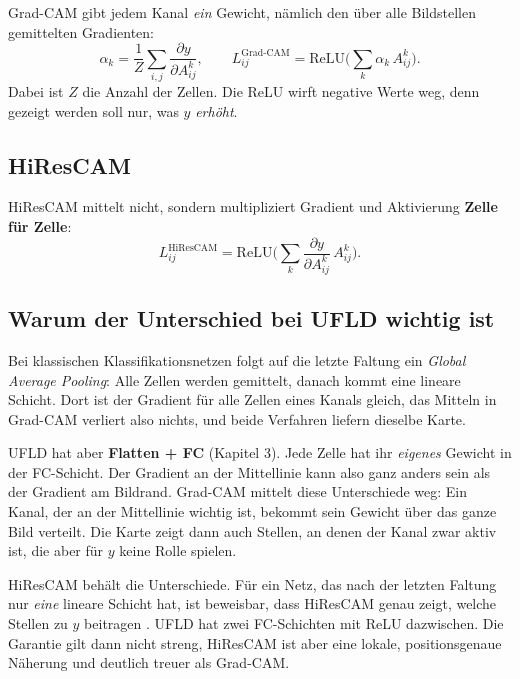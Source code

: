 \documentclass[11pt,a4paper]{article}
\begin{document}
Grad-CAM \cite{gradcam} gibt jedem Kanal \emph{ein} Gewicht, nämlich den über alle Bildstellen
gemittelten Gradienten:
\begin{equation*}
  \alpha_k = \frac{1}{Z}\sum_{i,j} \frac{\partial y}{\partial A^k_{ij}}, \qquad
  L^{\text{Grad-CAM}}_{ij} = \mathrm{ReLU}\Big(\sum_k \alpha_k\, A^k_{ij}\Big).
\end{equation*}
Dabei ist $Z$ die Anzahl der Zellen. Die ReLU wirft negative Werte weg, denn gezeigt werden soll
nur, was $y$ \emph{erhöht}.

\subsection{HiResCAM}

HiResCAM \cite{hirescam} mittelt nicht, sondern multipliziert Gradient und Aktivierung
\textbf{Zelle für Zelle}:
\begin{equation*}
  L^{\text{HiResCAM}}_{ij} = \mathrm{ReLU}\Big(\sum_k \frac{\partial y}{\partial A^k_{ij}}\, A^k_{ij}\Big).
\end{equation*}

\subsection{Warum der Unterschied bei UFLD wichtig ist}

Bei klassischen Klassifikationsnetzen folgt auf die letzte Faltung ein \emph{Global Average
Pooling}: Alle Zellen werden gemittelt, danach kommt eine lineare Schicht. Dort ist der Gradient
für alle Zellen eines Kanals gleich, das Mitteln in Grad-CAM verliert also nichts, und beide
Verfahren liefern dieselbe Karte.

UFLD hat aber \textbf{Flatten + FC} (Kapitel 3). Jede Zelle hat ihr \emph{eigenes} Gewicht in der
FC-Schicht. Der Gradient an der Mittellinie kann also ganz anders sein als der Gradient am
Bildrand. Grad-CAM mittelt diese Unterschiede weg: Ein Kanal, der an der Mittellinie wichtig ist,
bekommt sein Gewicht über das ganze Bild verteilt. Die Karte zeigt dann auch Stellen, an denen
der Kanal zwar aktiv ist, die aber für $y$ keine Rolle spielen.

HiResCAM behält die Unterschiede. Für ein Netz, das nach der letzten Faltung nur \emph{eine}
lineare Schicht hat, ist beweisbar, dass HiResCAM genau zeigt, welche Stellen zu $y$ beitragen
\cite{hirescam}. UFLD hat zwei FC-Schichten mit ReLU dazwischen. Die Garantie gilt dann nicht
streng, HiResCAM ist aber eine lokale, positionsgenaue Näherung und deutlich treuer als
Grad-CAM.
\end{document}
